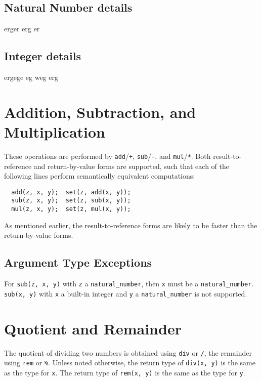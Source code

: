 \documentclass[a4paper]{article}
\begin{document}
\subsection{Natural Number details}

erger erg er

\subsection{Integer details}

ergege eg weg erg

\section{Addition, Subtraction, and Multiplication}

These operations are performed by \texttt{add}/\texttt{+}, \texttt{sub}/\texttt{-}, and \texttt{mul}/\texttt{*}. Both result-to-reference and return-by-value forms are supported, such that each of the following lines perform semantically equivalent computations:
\begin{verbatim}
  add(z, x, y);  set(z, add(x, y));
  sub(z, x, y);  set(z, sub(x, y));
  mul(z, x, y);  set(z, mul(x, y));
\end{verbatim}
As mentioned earlier, the result-to-reference forms are likely to be faster than the return-by-value forms.

\subsection{Argument Type Exceptions}

For \texttt{sub(z, x, y)} with \texttt{z} a \texttt{natural\_number}, then \texttt{x} must be a \texttt{natural\_number}. \texttt{sub(x, y)} with \texttt{x} a built-in integer and \texttt{y} a \texttt{natural\_number} is not supported.

\section{Quotient and Remainder}

The quotient of dividing two numbers is obtained using \texttt{div} or \texttt{/}, the remainder using \texttt{rem} or \texttt{\%}. Unless noted otherwise, the return type of \texttt{div(x, y)} is the same as the type for \texttt{x}. The return type of \texttt{rem(x, y)} is the same as the type for \texttt{y}.
\end{document}
